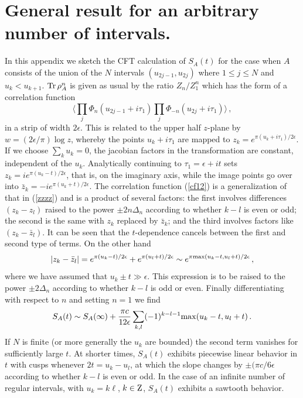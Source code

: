 {\section{General result for an arbitrary number of intervals.} 
\label{slitapp}

In this appendix we sketch the CFT calculation of
$S_A(t)$ for the case when $A$ consists of the union of the $N$
intervals $(u_{2j-1},u_{2j})$ where $1\leq j\leq N$ and
$u_k<u_{k+1}$. ${\rm Tr}\,\rho_A^n$ is given as usual by the ratio
$Z_n/Z_1^n$ which has the form of a correlation function
\begin{equation}
\label{cf12}
\langle\prod_j\Phi_n(u_{2j-1}+i\tau_1)
\prod_j\Phi_{-n}(u_{2j}+i\tau_1)\rangle\,,
\end{equation}
in a strip of width $2\epsilon$. This is related to the upper half
$z$-plane by $w=(2\epsilon/\pi)\log z$, whereby the points
$u_k+i\tau_1$ are mapped to $z_k=e^{\pi(u_k+i\tau_1)/2\epsilon}$.
If we choose $\sum_ku_k=0$, the jacobian factors in the
transformation are constant, independent of the $u_k$.
Analytically continuing to $\tau_1=\epsilon+it$ sets
$z_k=ie^{\pi(u_k-t)/2\epsilon}$, that is, on the imaginary axis,
while the image points go over into $\bar
z_k=-ie^{\pi(u_k+t)/2\epsilon}$. The correlation function
(\ref{cf12}) is a generalization of that in (\ref{zzzz}) and is a
product of several factors: the first involves differences
$(z_k-z_l)$ raised to the power $\pm 2n\Delta_n$ according to
whether $k-l$ is even or odd; the second is the same with $z_k$
replaced by $\bar z_k$; and the third involves factors like
$(z_k-\bar z_l)$. It can be seen that the $t$-dependence cancels
between the first and second type of terms. On the other hand
\begin{equation}
|z_k-\bar z_l|=e^{\pi(u_k-t)/2\epsilon}+ e^{\pi(u_l+t)/2\epsilon}
\sim e^{\pi{\rm max}(u_k-t,u_l+t)/2\epsilon}\,,
\end{equation}
where we have assumed that $u_k\pm t\gg\epsilon$. This expression
is to be raised to the power $\pm 2\Delta_n$ according to whether
$k-l$ is odd or even. Finally differentiating with respect to $n$
and setting $n=1$ we find
\begin{equation}
S_A(t)\sim S_A(\infty) +\frac{\pi c}{12\epsilon}
\sum_{k,l}(-1)^{k-l-1}{\rm max}(u_k-t,u_l+t)\,.
\end{equation}
If $N$ is finite (or more generally the $u_k$ are bounded) the
second term vanishes for sufficiently large $t$. At shorter times,
$S_A(t)$ exhibits piecewise linear behavior in $t$ with cusps
whenever $2t=u_k-u_l$, at which the slope changes by $\pm(\pi
c/6\epsilon$ according to whether $k-l$ is even or odd. In the
case of an infinite number of regular intervals, with $u_k=k\ell$,
$k\in{\rm Z}$, $S_A(t)$ exhibits a sawtooth behavior.



}
